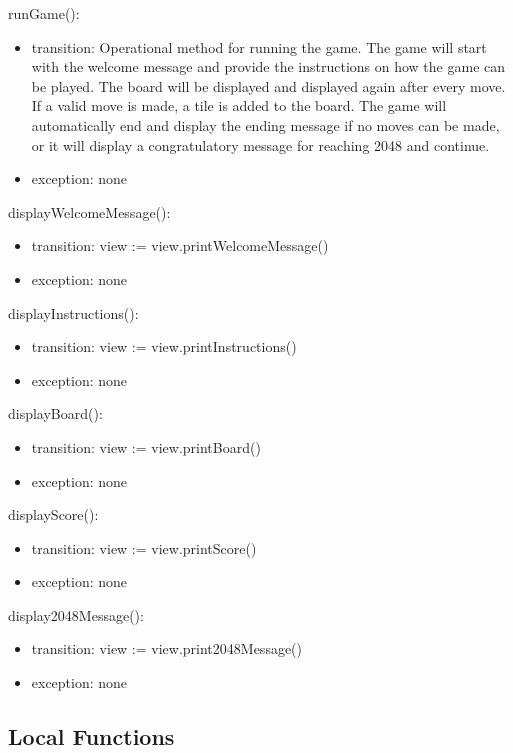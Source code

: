 \documentclass[12pt]{article}
\begin{document}
\noindent runGame():
\begin{itemize}
\item transition: Operational method for running the game. The game will start with the welcome message and provide the instructions on how the game can be played. The board will be displayed and displayed again after every move. If a valid move is made, a tile is added to the board. The game will automatically end and display the ending message if no moves can be made, or it will display a congratulatory message for reaching 2048 and continue.
\item exception: none
\end{itemize}

\noindent displayWelcomeMessage():
\begin{itemize}
\item transition: view := view.printWelcomeMessage()
\item exception: none
\end{itemize}

\noindent displayInstructions():
\begin{itemize}
\item transition: view := view.printInstructions()
\item exception: none
\end{itemize}

\noindent displayBoard():
\begin{itemize}
\item transition: view := view.printBoard()
\item exception: none
\end{itemize}

\noindent displayScore():
\begin{itemize}
\item transition: view := view.printScore()
\item exception: none
\end{itemize}

\noindent display2048Message():
\begin{itemize}
\item transition: view := view.print2048Message()
\item exception: none
\end{itemize}


\subsection*{Local Functions}
\end{document}
